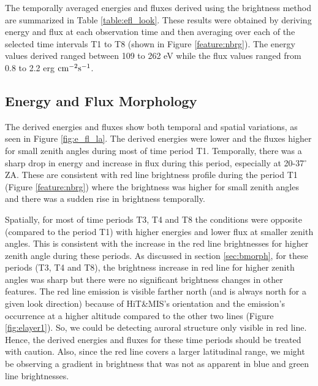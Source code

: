 \documentclass[crop=false,class=mitthesis,oneside,font=12pt]{standalone}
\begin{document}
The temporally averaged energies and fluxes derived using the brightness method are summarized in Table \ref{table:efl_look}. These results were obtained by deriving energy and flux at each observation time and then averaging over each of the selected time intervals T1 to T8 (shown in Figure \ref{feature:nbrg}). The energy values derived ranged between 109 to 262 eV while the flux values ranged from 0.8 to 2.2 erg $\rm cm^{-2} s^{-1}$.


\subsection{Energy and Flux Morphology}
\label{sec:emorph}
The derived energies and fluxes show both temporal and spatial variations, as seen in Figure \ref{fig:e_fl_la}. The derived energies were lower and the fluxes higher for small zenith angles during most of time period T1. Temporally, there was a sharp drop in energy and increase in flux during this period, especially at 20-37$^\circ$ ZA. These are consistent with red line brightness profile during the period T1 (Figure \ref{feature:nbrg}) where the brightness was higher for small zenith angles and there was a sudden rise in brightness temporally.

Spatially, for most of time periods T3, T4 and T8 the conditions were opposite (compared to the period T1) with higher energies and lower flux at smaller zenith angles. This is consistent with the increase in the red line brightnesses for higher zenith angle during these periods. As discussed in section \ref{sec:bmorph}, for these periods (T3, T4 and T8), the brightness increase in red line for higher zenith angles was sharp but there were no significant brightness changes in other features. The red line emission is visible farther north (and is always north for a given look direction) because of HiT\&MIS's orientation and the emission's occurrence at a higher altitude compared to the other two lines (Figure \ref{fig:elayer1}). So, we could be detecting auroral structure only visible in red line. Hence, the derived energies and fluxes for these time periods should be treated with caution. Also, since the red line covers a larger latitudinal range, we might be observing a gradient in brightness that was not as apparent in blue and green line brightnesses. 
\end{document}

